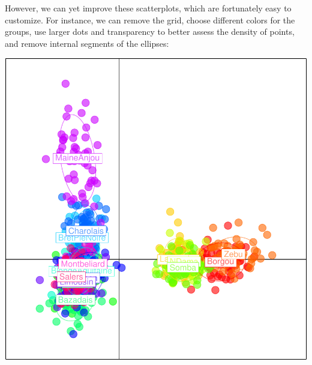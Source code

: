 \documentclass{article}
\begin{document}
However, we can yet improve these scatterplots, which are fortunately easy to customize.
For instance, we can remove the grid, choose different colors for the groups, use larger dots and transparency to
better assess the density of points, and remove internal segments of the ellipses:
\begin{Schunk}
\end{Schunk}
\includegraphics{figs/base-078}
~\\
\end{document}
